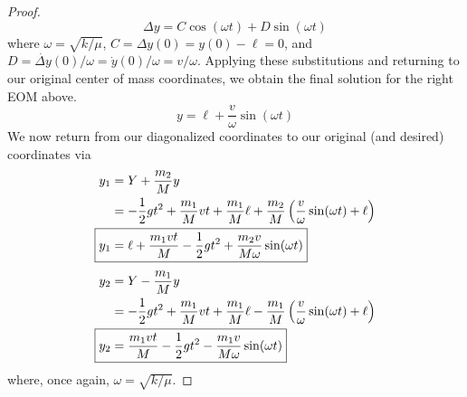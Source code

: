 \documentclass[../psets.tex]{subfiles}
\begin{document}
\begin{enumerate}
\begin{proof}
        \begin{equation*}
            \Delta y = C\cos(\omega t)+D\sin(\omega t)
        \end{equation*}
        where $\omega=\sqrt{k/\mu}$, $C=\Delta y(0)=y(0)-\ell=0$, and $D=\dot{\Delta y}(0)/\omega=\dot{y}(0)/\omega=v/\omega$. Applying these substitutions and returning to our original center of mass coordinates, we obtain the final solution for the right EOM above.
        \begin{equation*}
            y = \ell+\frac{v}{\omega}\sin(\omega t)
        \end{equation*}
        We now return from our diagonalized coordinates to our original (and desired) coordinates via
        \begin{align*}
            y_1 &= Y+\frac{m_2}{M}y\\
            &= -\frac{1}{2}gt^2+\frac{m_1}{M}vt+\frac{m_1}{M}\ell+\frac{m_2}{M}\left( \frac{v}{\omega}\sin(\omega t)+\ell \right)\\
            \Aboxed{y_1 &= \ell+\frac{m_1vt}{M}-\frac{1}{2}gt^2+\frac{m_2v}{M\omega}\sin(\omega t)}
        \end{align*}
        \begin{align*}
            y_2 &= Y-\frac{m_1}{M}y\\
            &= -\frac{1}{2}gt^2+\frac{m_1}{M}vt+\frac{m_1}{M}\ell-\frac{m_1}{M}\left( \frac{v}{\omega}\sin(\omega t)+\ell \right)\\
            \Aboxed{y_2 &= \frac{m_1vt}{M}-\frac{1}{2}gt^2-\frac{m_1v}{M\omega}\sin(\omega t)}
        \end{align*}
        where, once again, $\omega=\sqrt{k/\mu}$.
    \end{proof}

\end{enumerate}
\end{document}
